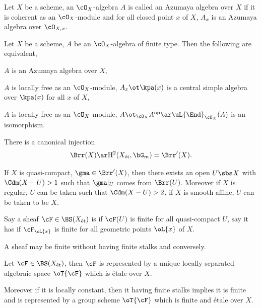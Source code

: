 \documentclass[a4paper, twoside]{article}
\begin{document}
\begin{dfn}
  Let $X$ be a scheme, an $\cO_{X}$-algebra $A$ is called an Azumaya algebra over $X$ if it is coherent as an $\cO_{X}$-module and for all closed point $x$ of $X$, $A_{x}$ is an Azumaya algebra over $\cO_{X,x}$.
\end{dfn}

\begin{thm}
  Let $X$ be a scheme, $A$ be an $\cO_{X}$-algebra of finite type. Then the following are equivalent,
  \begin{enr}
    \item $A$ is an Azumaya algebra over $X$,
    \item $A$ is locally free as an $\cO_{X}$-module, $A_{x}\ot\kpa(x)$ is a central simple algebra over $\kpa(x)$ for all $x$ of $X$,
    \item $A$ is locally free as an $\cO_{X}$-module, $A\ot_{\cO_{X}}A^{\text{op}}\ar\uL{\End}_{\cO_{X}}(A)$ is an isomorphism.
  \end{enr}
\end{thm}

\begin{thm}
  There is a canonical injection
  \[
    \Brr(X)\ar \mathrm{H}_{}^{2}(X_{\text{{\'e}t}}, \bG_{m})=\Brr'(X).
  \]

  If $X$ is quasi-compact, $\gma\in\Brr'(X)$, then there exists an open $U\sbs X$ with $\Cdm(X-U)>1$ such that $\gma|_{U}$ comes from $\Brr(U)$. Moreover if $X$ is regular, $U$ can be taken such that $\Cdm(X-U)>2$, if $X$ is smooth affine, $U$ can be taken to be $X$.
\end{thm}

\begin{dfn}
  Say a sheaf $\cF\in\BS(X_{\text{{\'e}t}})$ is  if $\cF(U)$ is finite for all quasi-compact $U$, say it has  if $\cF_{\oL{x}}$ is finite for all geometric points $\oL{x}$ of $X$.
\end{dfn}

\begin{rmk}
  A sheaf may be finite without having finite stalks and conversely.
\end{rmk}

\begin{thm}
  Let $\cF\in\BS(X_{\text{{\'e}t}})$, then $\cF$ is represented by a unique locally separated algebraic space $\oT{\cF}$ which is {\'e}tale over $X$.

  Moreover if it is locally constant, then it having finite stalks implies it is finite and is represented by a group scheme $\oT{\cF}$ which is finite and {\'e}tale over $X$.
\end{thm}
\end{document}
